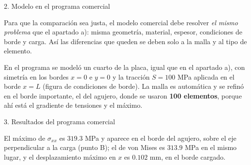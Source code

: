 \begin{desarrollo}{2. Modelo en el programa comercial}

Para que la comparaci\'on sea justa, el modelo comercial debe resolver
\emph{el mismo problema} que el apartado a): misma geometr\'ia, material,
espesor, condiciones de borde y carga. As\'i las diferencias que queden se
deben solo a la malla y al tipo de elemento.

En el programa se model\'o un cuarto de la placa, igual que en el apartado a),
con simetr\'ia en los bordes $x=0$ e $y=0$ y la tracci\'on $S=100$ MPa aplicada
en el borde $x=L$ (figura de condiciones de borde). La malla es autom\'atica y
se refin\'o en el borde importante, el del agujero, donde se usaron
\textbf{100 elementos}, porque ah\'i est\'a el gradiente de tensiones y el
m\'aximo.

\begin{center}
\hfill
{}
\end{center}
\end{desarrollo}

\begin{desarrollo}{3. Resultados del programa comercial}

\begin{center}
\hfill
{}

\vspace{6pt}
\end{center}

El m\'aximo de $\sigma_{xx}$ es $319.3$ MPa y aparece en el borde del agujero,
sobre el eje perpendicular a la carga (punto B); el de von Mises es
$313.9$ MPa en el mismo lugar, y el desplazamiento m\'aximo en $x$ es
$0.102$ mm, en el borde cargado.
\end{desarrollo}

